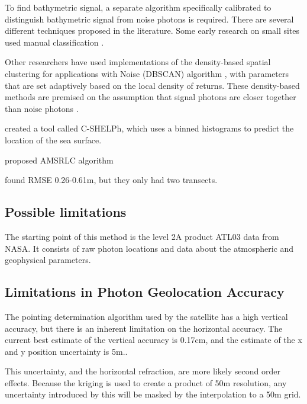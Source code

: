 To find bathymetric signal, a separate algorithm specifically calibrated to distinguish bathymetric signal from noise photons is required. There are several different techniques proposed in the literature. Some early research on small sites used manual classification \parencite{Forfinski-Sarkozi2016,Thomas2021d,Babbel2021a,Albright2021}.

Other researchers have used implementations of the density-based spatial clustering for applications with Noise (DBSCAN) algorithm \parencite{Ester1996}, with parameters that are set adaptively based on the local density of returns. These density-based methods are premised on the assumption that signal photons are closer together than noise photons \parencite{Neuenschwander2019}.

\citeauthor{Thomas2022} created a tool called C-SHELPh, which uses a binned histograms to predict the location of the sea surface.


\citeauthor{Xu2022} proposed AMSRLC algorithm

\citeauthor{Hsu2021} found RMSE 0.26-0.61m, but they only had two transects.

\subsection{Possible limitations}

The starting point of this method is the level 2A product ATL03 data from NASA. It consists of raw photon locations and data about the atmospheric and geophysical parameters. 

\subsection{Limitations in Photon Geolocation Accuracy}

The pointing determination algorithm used by the satellite has a high vertical accuracy, but there is an inherent limitation on the horizontal accuracy. The current best estimate of the vertical accuracy is 0.17cm, and the estimate of the x and y position uncertainty is 5m..

This uncertainty, and the horizontal refraction, are more likely second order effects. Because the kriging is used to create a product of 50m resolution, any uncertainty introduced by this will be masked by the interpolation to a 50m grid.

